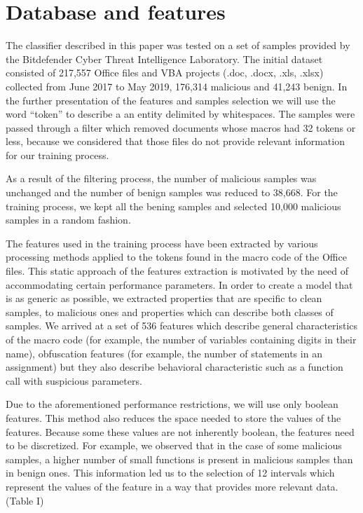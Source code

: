 \section{Database and features}
\par
The classifier described in this paper was tested on a set of samples provided by the Bitdefender Cyber Threat Intelligence Laboratory. The initial dataset consisted of 217,557 Office files and VBA projects (.doc, .docx, .xls, .xlsx) collected from June 2017 to May 2019, 176,314 malicious and 41,243 benign. In the further presentation of the features and samples selection we will use the word “token” to describe a an entity delimited by whitespaces. The samples were passed through a filter which removed documents whose macros had 32 tokens or less, because we considered that those files do not provide relevant information for our training process.
\par
As a result of the filtering process, the number of malicious samples was unchanged and the number of benign samples was reduced to 38,668. For the training process, we kept all the bening samples and selected 10,000 malicious samples in a random fashion.
\par
The features used in the training process have been extracted by various processing methods applied to the tokens found in the macro code of the Office files. This static approach of the features extraction is motivated by the need of accommodating certain performance parameters. In order to create a model that is as generic as possible, we extracted properties that are specific to clean samples, to malicious ones and properties which can describe both classes of samples. We arrived at a set of 536 features which describe general characteristics of the macro code (for example, the number of variables containing digits in their name), obfuscation features (for example, the number of statements in an assignment) but they also describe behavioral characteristic such as a function call with suspicious parameters.
\par
Due to the aforementioned performance restrictions, we will use only boolean features. This method also reduces the space needed to store the values of the features. Because some these values are not inherently boolean, the features need to be discretized. For example, we observed that in the case of some malicious samples, a higher number of small functions is present in malicious samples than in benign ones. This information led us to the selection of 12 intervals which represent the values of the feature in a way that provides more relevant data. (Table I)
